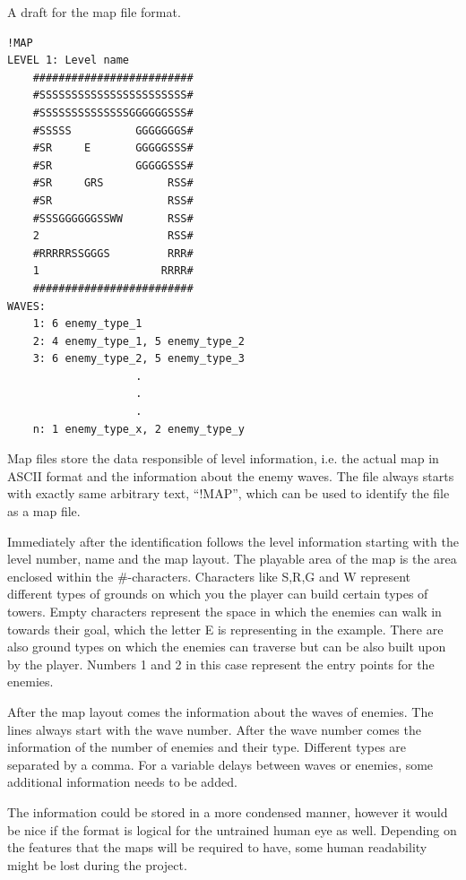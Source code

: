 \documentclass[11pt]{article}
\begin{document}
A draft for the map file format.

\begin{verbatim}
!MAP
LEVEL 1: Level name
	#########################
	#SSSSSSSSSSSSSSSSSSSSSSS#
	#SSSSSSSSSSSSSSGGGGGGSSS#
	#SSSSS          GGGGGGGS#
	#SR     E       GGGGGSSS#
	#SR             GGGGGSSS#
	#SR     GRS          RSS#
	#SR                  RSS#
	#SSSGGGGGGSSWW       RSS#
	2                    RSS#
	#RRRRRSSGGGS         RRR#
	1                   RRRR#
	#########################
WAVES:
	1: 6 enemy_type_1
	2: 4 enemy_type_1, 5 enemy_type_2
	3: 6 enemy_type_2, 5 enemy_type_3
					.
					.
					.
	n: 1 enemy_type_x, 2 enemy_type_y
\end{verbatim}

Map files store the data responsible of level information, i.e. the
actual map in ASCII format and the information about the enemy
waves. The file always starts with exactly same arbitrary text,
``!MAP'', which can be used to identify the file as a map file.

Immediately after the identification follows the level information
starting with the level number, name and the map layout. The playable area
of the map is the area enclosed within the \#-characters. Characters
like S,R,G and W represent different types of grounds on which you the
player can build certain types of towers. Empty characters represent
the space in which the enemies can walk in towards their goal, which
the letter E is representing in the example. There are also ground
types on which the enemies can traverse but can be also built upon by
the player. Numbers 1 and 2 in this case represent the entry points
for the enemies.

After the map layout comes the information about the waves of
enemies. The lines always start with the wave number. After the wave
number comes the information of the number of enemies and their
type. Different types are separated by a comma. For a variable delays
between waves or enemies, some additional information needs to be
added.

The information could be stored in a more condensed manner, however it
would be nice if the format is logical for the untrained human eye as
well. Depending on the features that the maps will be required to
have, some human readability might be lost during the project.
\end{document}
